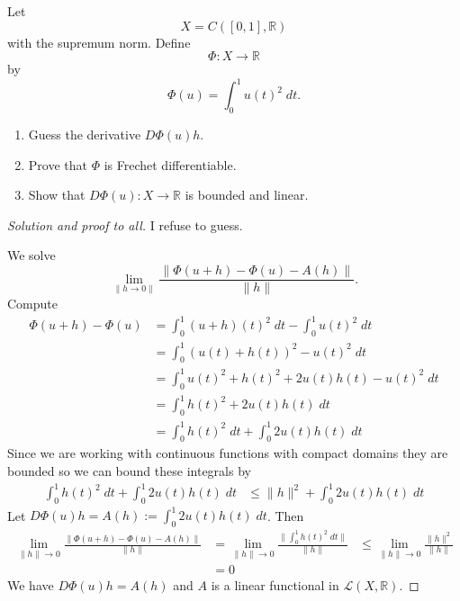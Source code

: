 \begin{prob}
    Let 
    \[
        X = C([0,1],\mathbb R)
    \]
    with the supremum norm. Define 
    \[
        \Phi : X \to \mathbb R
    \]
    by 
    \[
        \Phi(u) = \int_0^1 u(t)^2 \; dt.
    \]

    \begin{enumerate}[label=\alph*)]
        \item Guess the derivative $D\Phi(u)h$. 
        \item Prove that $\Phi$ is Frechet differentiable.
        \item Show that $D\Phi(u) : X \to \mathbb R$ is bounded 
            and linear.
    \end{enumerate}
\end{prob}
\begin{proof}[Solution and proof to all]
    I refuse to guess. 

    We solve 
    \[
        \lim_{\|h \to 0\|} \frac{\|\Phi(u + h) - 
        \Phi(u) - A(h)\|}{\|h\|}. 
    \]
    Compute 
    \begin{align*}
        \Phi(u + h) - \Phi(u) 
        &= \int_0^1 (u+h)(t)^2 \; dt 
        - \int_0^1 u(t)^2 \; dt
        \\ 
        &= \int_0^1 (u(t) + h(t))^2 - u(t)^2 \;dt  
        \\ 
        &= \int_0^1 u(t)^2 + h(t)^2 + 2u(t)h(t) - u(t)^2 \;dt
        \\ 
        &= \int_0^1 h(t)^2 + 2u(t)h(t) \; dt
        \\ 
        &= \int_0^1 h(t)^2 \; dt + \int_0^1 2u(t)h(t) \;dt
    \end{align*}
    Since we are working with continuous 
    functions with compact domains they are bounded so we 
    can bound these integrals 
    by 
    \begin{align*}
        \int_0^1 h(t)^2 \; dt + \int_0^1 2u(t)h(t) \; dt
        &\leq \|h\|^2 + \int_0^1 2u(t)h(t) \; dt
    \end{align*}
    Let $D\Phi(u)h = A(h) := \int_0^1 2u(t) h(t) \; dt$. Then 
    \begin{align*}
        \lim_{\|h\|\to 0} \frac{\|\Phi(u+h) - \Phi(u) - A(h)\|}{\|h\|}
        &= 
        \lim_{\|h\| \to 0} \frac{\|\int_0^1 h(t)^2 \; dt\|}{\|h\|}
        &\leq 
        \lim_{\|h\|\to 0} \frac{\|h\|^2}{\|h\|} \\ 
        &= 0
    \end{align*}
    We have $D\Phi(u)h = A(h)$ and $A$ is a linear functional in 
    $\mathcal L(X, \mathbb R)$.
\end{proof}

